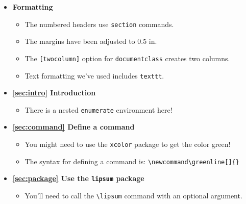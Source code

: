 \documentclass[twocolumn]{article}
\begin{document}
\begin{itemize}
    \item \textbf{Formatting}
    \begin{itemize}
        \item The numbered headers use \texttt{section} commands.
        \item The margins have been adjusted to 0.5 in.
        \item The \texttt{[twocolumn]} option for \texttt{documentclass} creates two columns.
        \item Text formatting we've used includes \texttt{texttt}.
    \end{itemize}
    \item \textbf{\ref{sec:intro} Introduction}
    \begin{itemize}
        \item There is a nested \texttt{enumerate} environment here!
    \end{itemize}
    \item \textbf{\ref{sec:command} Define a command}
    \begin{itemize}
        \item You might need to use the \texttt{xcolor} package to get the color green!
        \item The syntax for defining a command is: \texttt{\textbackslash newcommand\textbackslash greenline[]\{\}}
    \end{itemize}
    \item \textbf{\ref{sec:package} Use the \texttt{lipsum} package}
    \begin{itemize}
        \item You'll need to call the \texttt{\textbackslash lipsum} command with an optional argument.
    \end{itemize}
\end{itemize}
\end{document}
